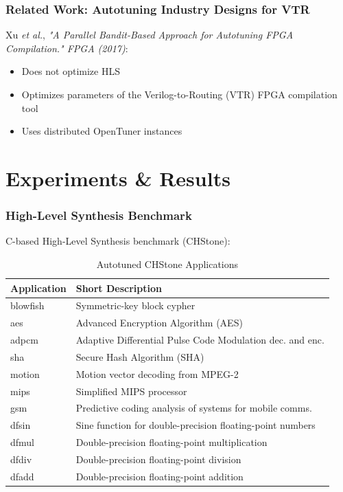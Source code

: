 \documentclass[10pt, compress, xcolor={table,xcdraw,usenames}, aspectratio=169]{beamer}
\begin{document}
\begin{frame}
    \frametitle{Related Work: Autotuning Industry Designs for VTR}
        \alert{Xu \emph{et al.}}, \emph{"A Parallel Bandit-Based Approach
        for Autotuning FPGA Compilation." FPGA (2017)}:
        \begin{itemize}
            \item \alert{Does not optimize HLS}
            \item Optimizes \alert{parameters} of the
                \alert{Verilog-to-Routing} (\alert{VTR}) FPGA compilation tool
            \item Uses \alert{distributed OpenTuner instances}
        \end{itemize}
\end{frame}

\section{Experiments \& Results}

\begin{frame}
    \frametitle{High-Level Synthesis Benchmark}
    \begin{block}{C-based High-Level Synthesis \alert{benchmark}
        (\alert{CHStone}):}
        \begin{table}[htpb]
            \footnotesize
            \caption{Autotuned CHStone Applications}
            \centering
            \begin{tabular}{@{}p{}p{}@{}}
                \toprule
                Application & Short Description \\ \midrule
                blowfish & Symmetric-key block cypher \\
                aes & Advanced Encryption Algorithm (AES) \\
                adpcm & Adaptive Differential Pulse Code Modulation dec. and enc. \\
                sha & Secure Hash Algorithm (SHA) \\
                motion & Motion vector decoding from MPEG-2 \\
                mips & Simplified MIPS processor \\
                gsm & Predictive coding analysis of systems for mobile comms. \\
                dfsin & Sine function for double-precision floating-point numbers \\
                dfmul & Double-precision floating-point multiplication \\
                dfdiv & Double-precision floating-point division \\
                dfadd & Double-precision floating-point addition \\ \bottomrule
            \end{tabular}
        \end{table}
    \end{block}
\end{frame}
\end{document}
